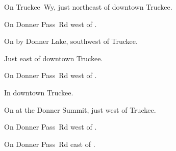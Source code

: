 
\begin{LocationList}

On Truckee~Wy, just northeast of downtown Truckee.

On Donner Pass~Rd west of .

On  by Donner Lake, southwest of Truckee.

Just east of downtown Truckee.

On Donner Pass~Rd west of .

In downtown Truckee.

\Location{\RestArea \Rest}
On  at the Donner Summit, just west of Truckee.

\Location{\TruckService \Service}
On Donner Pass~Rd west of .

On Donner Pass~Rd east of .

\end{LocationList}


